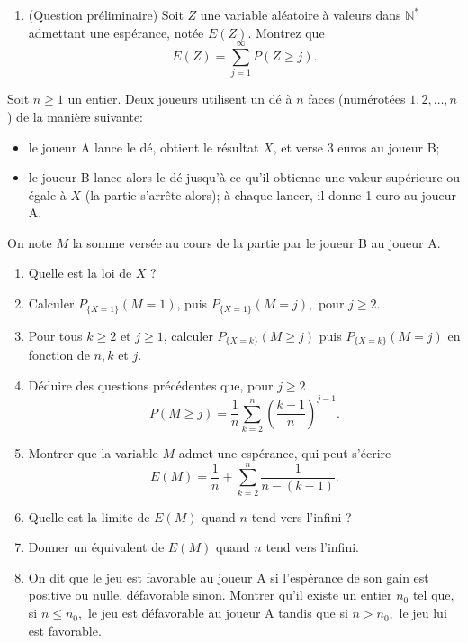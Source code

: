 \documentclass[a4paper,12pt,reqno]{amsart}
\begin{document}
\begin{exo}%
  \begin{enumerate}
    \item(Question préliminaire) Soit $Z$ une variable aléatoire à valeurs dans $\mathbb N^*$ admettant une espérance, notée $E(Z)$. Montrez que
    $$
      E(Z) = \sum_{j = 1}^\infty  P(Z\ge j).
    $$
    \end{enumerate}
    Soit $n \ge 1$ un entier. Deux joueurs utilisent un dé à $n$ faces (numérotées $1, 2, \ldots, n$) de la manière suivante:
    \begin{itemize}
      \item le joueur A lance le dé, obtient le résultat $X$, et verse 3 euros au joueur B;
      \item le joueur B lance alors le dé jusqu'à ce qu'il obtienne une valeur supérieure ou égale à $X$ (la partie s'arrête alors); à chaque lancer, il donne 1 euro au joueur A.
    \end{itemize}
    On note $M$ la somme versée au cours de la partie par le joueur B au joueur A.
    \begin{enumerate}[resume]
      \item Quelle est la loi de $X$ ?
      \item Calculer $P_{\{X=1\}}(M=1)$, puis $P_{\{X=1\}}(M=j),$ pour $j \ge 2$.
      \item Pour tous $k \ge 2$ et  $j \ge 1$, calculer  $P_{\{X=k\}}(M \ge j)$ puis $P_{\{X=k\}}(M=j)$ en fonction de $n, k$ et $j$.
      \item Déduire des questions précédentes que, pour $j \ge 2$
        $$
          P(M \ge j)  = \frac{1}{n } \sum_{k=2}^n \left(\frac{k-1}{n}\right)^{j-1}.
        $$
      \item Montrer que la variable $M$ admet une espérance, qui peut s'écrire
        $$
          E(M) = \frac{1}{n} + \sum_{k=2}^{n} \frac{1}{n-(k-1)}.
        $$
      \item Quelle est la limite de  $E(M)$ quand  $n$ tend vers l'infini ?
      \item Donner un équivalent de $E(M)$ quand $n$ tend vers l'infini.
      \item On dit que le jeu est favorable au joueur A si l'espérance de son gain est positive ou nulle, défavorable sinon. Montrer qu'il existe un entier $n_0$ tel que, si $n \le n_0,$ le jeu est défavorable au joueur A tandis que si $n > n_0,$ le jeu lui est favorable.
  \end{enumerate}
\end{exo}
\end{document}
